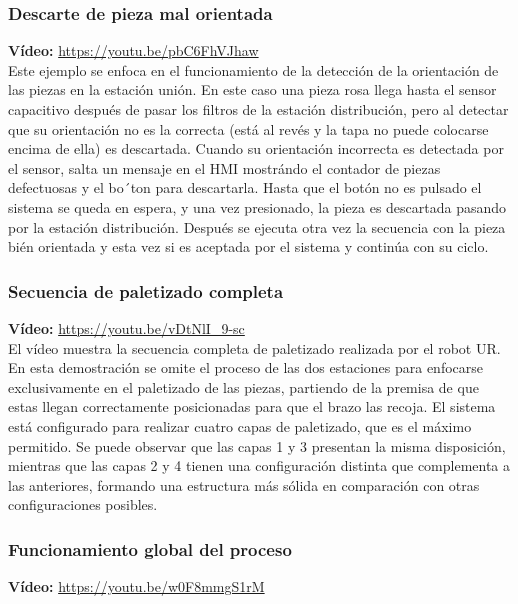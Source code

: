 \subsubsection{Descarte de pieza mal orientada}

\textbf{Vídeo:} \url{https://youtu.be/pbC6FhVJhaw} \\

Este ejemplo se enfoca en el funcionamiento de la detección de la orientación de las piezas en la estación unión. En este caso una pieza rosa llega hasta el sensor capacitivo después de pasar los filtros de la estación distribución, pero al detectar que su orientación no es la correcta (está al revés y la tapa no puede colocarse encima de ella) es descartada. Cuando su orientación incorrecta es detectada por el sensor, salta un mensaje en el HMI mostrándo el contador de piezas defectuosas y el bo´ton para descartarla. Hasta que el botón no es pulsado el sistema se queda en espera, y una vez presionado, la pieza es descartada pasando por la estación distribución. Después se ejecuta otra vez la secuencia con la pieza bién orientada y esta vez si es aceptada por el sistema y continúa con su ciclo.

\subsubsection{Secuencia de paletizado completa}

\textbf{Vídeo:} \url{https://youtu.be/vDtNlI_9-sc} \\

El vídeo muestra la secuencia completa de paletizado realizada por el robot UR. En esta demostración se omite el proceso de las dos estaciones para enfocarse exclusivamente en el paletizado de las piezas, partiendo de la premisa de que estas llegan correctamente posicionadas para que el brazo las recoja. El sistema está configurado para realizar cuatro capas de paletizado, que es el máximo permitido. Se puede observar que las capas 1 y 3 presentan la misma disposición, mientras que las capas 2 y 4 tienen una configuración distinta que complementa a las anteriores, formando una estructura más sólida en comparación con otras configuraciones posibles.

\subsubsection{Funcionamiento global del proceso}

\textbf{Vídeo:} \url{https://youtu.be/w0F8mmgS1rM} \\

